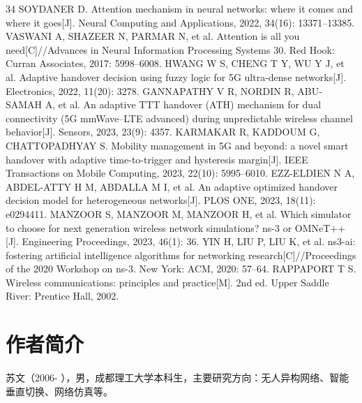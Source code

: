 \documentclass[10pt,a4paper]{ctexart}
\begin{document}
{\begin{thebibliography}{34}
 SOYDANER D. Attention mechanism in neural networks: where it comes and where it goes[J]. Neural Computing and Applications, 2022, 34(16): 13371--13385.
 VASWANI A, SHAZEER N, PARMAR N, et al. Attention is all you need[C]//Advances in Neural Information Processing Systems 30. Red Hook: Curran Associates, 2017: 5998--6008.
 HWANG W S, CHENG T Y, WU Y J, et al. Adaptive handover decision using fuzzy logic for 5G ultra-dense networks[J]. Electronics, 2022, 11(20): 3278.
 GANNAPATHY V R, NORDIN R, ABU-SAMAH A, et al. An adaptive TTT handover (ATH) mechanism for dual connectivity (5G mmWave--LTE advanced) during unpredictable wireless channel behavior[J]. Sensors, 2023, 23(9): 4357.
 KARMAKAR R, KADDOUM G, CHATTOPADHYAY S. Mobility management in 5G and beyond: a novel smart handover with adaptive time-to-trigger and hysteresis margin[J]. IEEE Transactions on Mobile Computing, 2023, 22(10): 5995--6010.
 EZZ-ELDIEN N A, ABDEL-ATTY H M, ABDALLA M I, et al. An adaptive optimized handover decision model for heterogeneous networks[J]. PLOS ONE, 2023, 18(11): e0294411.
 MANZOOR S, MANZOOR M, MANZOOR H, et al. Which simulator to choose for next generation wireless network simulations? ns-3 or OMNeT++[J]. Engineering Proceedings, 2023, 46(1): 36.
 YIN H, LIU P, LIU K, et al. ns3-ai: fostering artificial intelligence algorithms for networking research[C]//Proceedings of the 2020 Workshop on ns-3. New York: ACM, 2020: 57--64.
 RAPPAPORT T S. Wireless communications: principles and practice[M]. 2nd ed. Upper Saddle River: Prentice Hall, 2002.
\end{thebibliography}
}

\section*{作者简介}
苏文（2006- ），男，成都理工大学本科生，主要研究方向：无人异构网络、智能垂直切换、网络仿真等。
\end{document}
